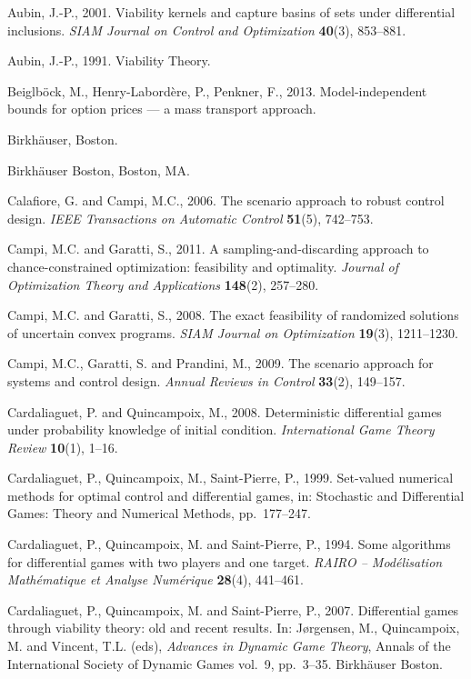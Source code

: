 \documentclass[10pt,twocolumn]{article}
\theoremstyle{plain}
\theoremstyle{definition}
\theoremstyle{remark}
\begin{document}
Aubin, J.-P., 2001. Viability kernels and capture basins of sets under differential
inclusions. \emph{SIAM Journal on Control and Optimization} \textbf{40}(3), 853--881.

Aubin, J.-P., 1991. Viability Theory.

Beiglb\"ock, M., Henry-Labord\`ere, P., Penkner, F., 2013.
Model-independent bounds for option prices --- a mass transport approach.

Birkh\"auser, Boston.

Birkh\"auser Boston, Boston, MA.

Calafiore, G. and Campi, M.C., 2006. The scenario approach to robust control design.
\emph{IEEE Transactions on Automatic Control} \textbf{51}(5), 742--753.

Campi, M.C. and Garatti, S., 2011. A sampling-and-discarding approach to chance-constrained
optimization: feasibility and optimality. \emph{Journal of Optimization Theory and
Applications} \textbf{148}(2), 257--280.

Campi, M.C. and Garatti, S., 2008. The exact feasibility of randomized solutions of uncertain
convex programs. \emph{SIAM Journal on Optimization} \textbf{19}(3), 1211--1230.

Campi, M.C., Garatti, S. and Prandini, M., 2009. The scenario approach for systems and
control design. \emph{Annual Reviews in Control} \textbf{33}(2), 149--157.

Cardaliaguet, P. and Quincampoix, M., 2008. Deterministic differential games under
probability knowledge of initial condition. \emph{International Game Theory Review}
\textbf{10}(1), 1--16.

Cardaliaguet, P., Quincampoix, M., Saint-Pierre, P., 1999. Set-valued
numerical methods for optimal control and differential games, in:
Stochastic and Differential Games: Theory and Numerical Methods,
pp.~177--247.

Cardaliaguet, P., Quincampoix, M. and Saint-Pierre, P., 1994. Some algorithms for differential
games with two players and one target. \emph{RAIRO -- Mod\'elisation Math\'ematique et Analyse
Num\'erique} \textbf{28}(4), 441--461.

Cardaliaguet, P., Quincampoix, M. and Saint-Pierre, P., 2007. Differential games through
viability theory: old and recent results. In: J\o rgensen, M., Quincampoix, M. and Vincent,
T.L. (eds), \emph{Advances in Dynamic Game Theory}, Annals of the International Society of
Dynamic Games vol.\ 9, pp.\ 3--35. Birkh\"auser Boston.
\end{document}

